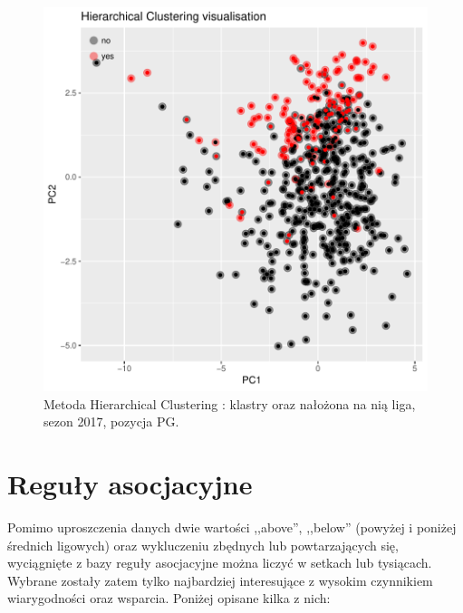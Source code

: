\documentclass[twoside,twocolumn]{article}
\begin{document}
\begin{figure}[hbt!]
  \centering
    \includegraphics[width=\linewidth]{plot_hclust.pdf}
  \caption{Metoda Hierarchical Clustering : klastry oraz nałożona na nią liga, sezon 2017, pozycja PG.}
  \label{fig:coffee}
\end{figure}

\newpage
\section{Reguły asocjacyjne}

\indent Pomimo uproszczenia danych dwie wartości ,,above'', ,,below'' (powyżej i poniżej średnich ligowych) oraz wykluczeniu zbędnych lub powtarzających się, wyciągnięte z bazy reguły asocjacyjne można liczyć w setkach lub tysiącach. Wybrane zostały zatem tylko najbardziej interesujące z wysokim czynnikiem wiarygodności oraz wsparcia. Poniżej opisane kilka z nich:
\end{document}
